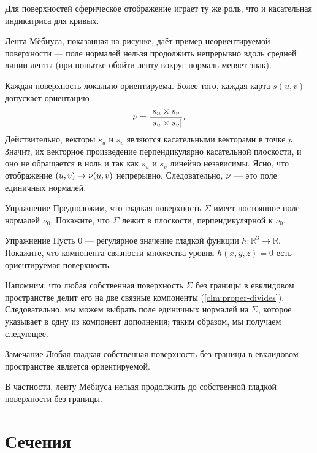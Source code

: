 Для поверхностей сферическое отображение играет ту же роль, что и касательная индикатриса для кривых.

Лента Мёбиуса, показанная на рисунке, даёт пример неориентируемой поверхности --- поле нормалей нельзя продолжить непрерывно вдоль средней линии ленты (при попытке обойти ленту вокруг нормаль меняет знак).

Каждая поверхность локально ориентируема.
Более того, каждая карта $s(u,v)$ допускает ориентацию 
\[\nu=
\frac{s_u\times s_v}
{\left|s_u\times s_v\right|}.\]
Действительно, векторы $s_u$ и $s_v$ являются касательными векторами в точке $p$.
Значит, их векторное произведение перпендикулярно касательной плоскости,
и оно не обращается в ноль
и так как $s_u$ и $s_v$ линейно независимы.
Ясно, что отображение $(u,v)\mapsto \nu(u,v)$ непрерывно.
Следовательно, $\nu$ --- это поле единичных нормалей.

{\sloppy

\begin{thm}{Упражнение}\label{ex:const-normal}
Предположим, что гладкая поверхность $\Sigma$ имеет постоянное поле нормалей $\nu_0$.
Покажите, что $\Sigma$ лежит в плоскости, перпендикулярной к $\nu_0$.
\end{thm}

}

\begin{thm}{Упражнение}\label{ex:implicit-orientable}
Пусть $0$ --- регулярное значение гладкой функции
$h:\mathbb{R}^3\to\mathbb{R}$.
Покажите, что компонента связности множества уровня $h(x,y,z)=0$ есть ориентируемая поверхность.
\end{thm}

Напомним, что любая собственная поверхность $\Sigma$ без границы в евклидовом пространстве делит его на две связные компоненты (\ref{clm:proper-divides}).
Следовательно, мы можем выбрать поле единичных нормалей на $\Sigma$, которое указывает в одну из компонент дополнения; таким образом, мы получаем следующее.

\begin{thm}{Замечание}
Любая гладкая собственная поверхность без границы в евклидовом пространстве является ориентируемой.
\end{thm}

В частности, ленту Мёбиуса нельзя продолжить до собственной гладкой поверхности без границы.

\section{Сечения}

